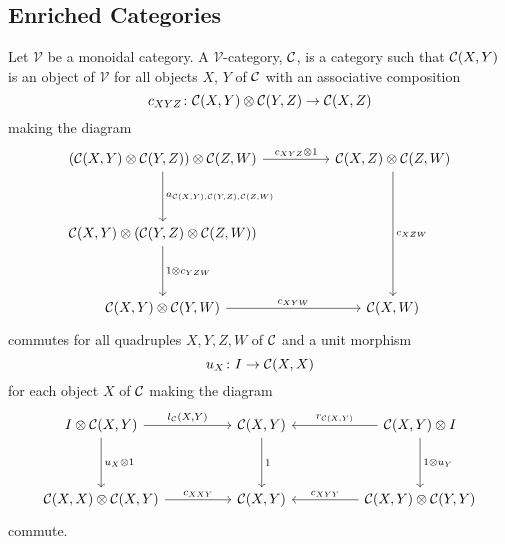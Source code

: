 \documentclass[dissertation.tex]{subfiles}
\begin{document}
\subsection{Enriched Categories}
\begin{defn}
  Let $\mathscr{V}$ be a monoidal category.
  A $\mathscr{V}$-category, $\mathcal{C}$, is a category such that $\mathcal{C}(X,Y)$ is an object of $\mathscr{V}$ for all objects $X$, $Y$ of $\mathcal{C}$ with an associative composition 
  $$c_{XYZ} \colon \mathcal{C}(X,Y) \otimes \mathcal{C}(Y,Z) \to \mathcal{C}(X,Z)$$
  making the diagram
  $$\begin{tikzcd}
    \left(\C(X,Y) \otimes \C(Y,Z)\right) \otimes \C(Z,W)\arrow{rr}{c_{XYZ} \otimes 1}\arrow{dd}{a_{\C(X,Y),\C(Y,Z),\C(Z,W)}} && \C(X,Z) \otimes \C(Z,W)\arrow{dddd}{c_{XZW}}\\
    \\
    \C(X,Y) \otimes \left(\C(Y,Z) \otimes \C(Z,W)\right)\arrow{dd}{1 \otimes c_{YZW}}\\
    \\
    \C(X,Y) \otimes \C(Y,W)\arrow{rr}{c_{XYW}} && \C(X,W)
  \end{tikzcd}$$
  commutes for all quadruples $X,Y,Z,W$ of $\mathcal{C}$
  and a unit morphism
  $$u_X \colon I \to \mathcal{C}(X,X)$$
  for each object $X$ of $\mathcal{C}$ making the diagram 
  $$\begin{tikzcd}
    I \otimes \C(X,Y) \arrow{rr}{l_\C(X,Y)}\arrow{dd}{u_X \otimes 1} && \C(X,Y) \arrow{dd}{1}&& \C(X,Y) \otimes I \arrow[swap]{ll}{r_{\C(X,Y)}}\arrow{dd}{1 \otimes u_Y}\\
    \\
    \C(X,X) \otimes \C(X,Y) \arrow{rr}{c_{XXY}} && \C(X,Y) && \C(X,Y) \otimes \C(Y,Y)\arrow[swap]{ll}{c_{XYY}}
  \end{tikzcd}$$
  commute.
\end{defn}
\end{document}
